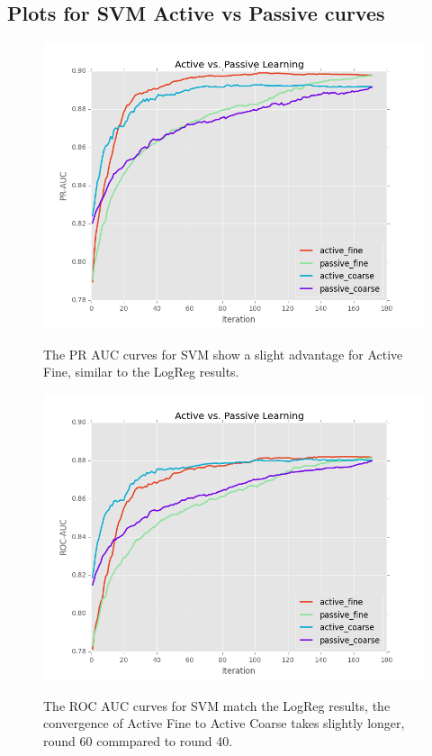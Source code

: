 \documentclass[ms]{nuthesis}
\begin{document}
\subsection{Plots for SVM Active vs Passive curves}
\FloatBarrier
\begin{figure}[!htb]
	\centering
    \includegraphics[width=1.0\columnwidth]{fig/runActPassSVM_pr}
    \label{fig:ActiveVsPassivePRSVM}
    \caption{The PR AUC curves for SVM show a slight advantage for Active Fine,
     similar to the LogReg results.}
\end{figure}
\FloatBarrier

\FloatBarrier
\begin{figure}[!htb]
	\centering
    \includegraphics[width=1.0\columnwidth]{fig/runActPassSVM_roc}
    \label{fig:ActiveVsPassiveROCSVM}
    \caption{The ROC AUC curves for SVM match the LogReg results, the convergence of
     Active Fine to Active Coarse takes slightly longer, round 60 commpared to round 40.}
\end{figure}
\FloatBarrier
\end{document}
